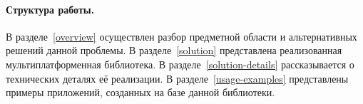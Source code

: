 
\vspace*{-0.6em}
\paragraph{Структура работы.} В разделе~\ref{overview} осуществлен разбор предметной области и альтернативных решений данной проблемы. В разделе~\ref{solution} представлена реализованная мультиплатформенная библиотека. В разделе~\ref{solution-details} рассказывается о технических деталях её реализации. В разделе~\ref{usage-examples} представлены примеры приложений, созданных на базе данной библиотеки.
